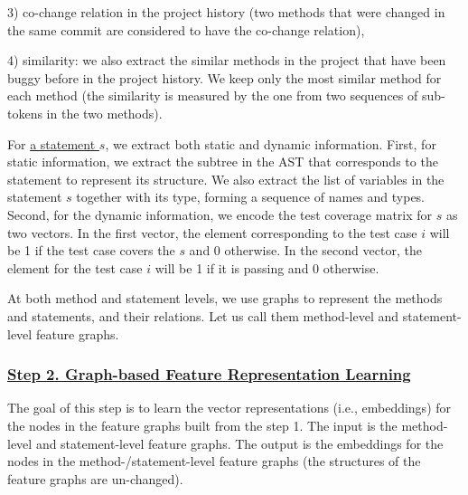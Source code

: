 3) co-change relation in the project history (two methods that were
changed in the same commit are considered to have the co-change
relation),

4) similarity: we also extract the similar methods in the project that
have been buggy before in the project history. We keep only the most
similar method for each method (the similarity is measured by the one
from two sequences of sub-tokens in the two methods).

For \underline{a statement $s$}, we extract both static and dynamic
information. First, for static information, we extract the subtree in
the AST that corresponds to the statement to represent its
structure. We also extract the list of variables in the statement $s$
together with its type, forming a sequence of names and types. Second,
for the dynamic information, we encode the test coverage matrix for
$s$ as two vectors. In the first vector, the element corresponding to
the test case $i$ will be 1 if the test case covers the $s$ and 0
otherwise. In the second vector, the element for the test case $i$
will be 1 if it is passing and 0 otherwise.

At both method and statement levels, we use graphs to represent
the methods and statements, and their relations. Let us call
them method-level and statement-level feature graphs.

\subsubsection*{\underline{Step 2. Graph-based Feature Representation Learning}}

The goal of this step is to learn the vector representations
(i.e., embeddings) for the nodes in the feature graphs built from the
step 1. The input is the method-level and statement-level feature
graphs. The output is the embeddings for the nodes in the
method-/statement-level feature graphs (the structures of the feature
graphs are un-changed).


